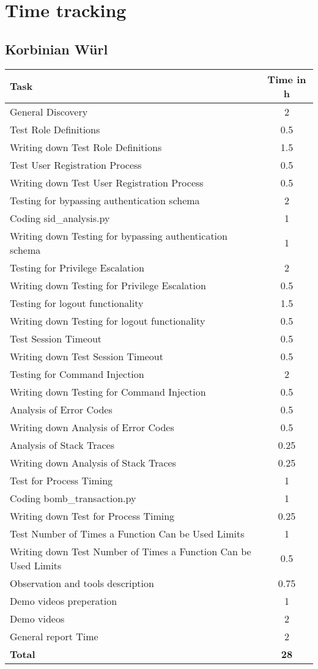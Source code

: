 \chapter{Time tracking}

\section{Korbinian Würl}
\begin{table}[H]
\tiny
\begin{tabular*}{\textwidth}{@{\extracolsep{\fill}} l c@{\extracolsep{0pt}} }
\textbf{Task} & \textbf{Time in h} \\ \hline
	General Discovery							& 2 \\
	Test Role Definitions						& 0.5\\
	Writing down Test Role Definitions			& 1.5\\
	Test User Registration Process				& 0.5\\
	Writing down Test User Registration Process	& 0.5\\
	Testing for bypassing authentication schema & 2\\
	Coding sid\_analysis.py 					& 1 \\
	Writing down Testing for bypassing authentication schema & 1 \\
	Testing for Privilege Escalation			& 2\\
	Writing down Testing for Privilege Escalation & 0.5\\
	Testing for logout functionality			& 1.5\\
	Writing down Testing for logout functionality & 0.5 \\
	Test Session Timeout						& 0.5 \\
	Writing down Test Session Timeout			& 0.5 \\
	Testing for Command Injection 				& 2 \\
	Writing down Testing for Command Injection 	& 0.5 \\
	Analysis of Error Codes	   					& 0.5\\
	Writing down Analysis of Error Codes	   	& 0.5 \\
	Analysis of Stack Traces 					& 0.25\\
	Writing down Analysis of Stack Traces 		& 0.25 \\
	Test for Process Timing 					& 1 \\
	Coding bomb\_transaction.py 				& 1 \\
	Writing down Test for Process Timing 		& 0.25 \\
	Test Number of Times a Function Can be Used Limits & 1 \\
	Writing down Test Number of Times a Function Can be Used Limits & 0.5 \\
	Observation and tools description			& 0.75 \\
	Demo videos	preperation						& 1 \\
	Demo videos									& 2 \\
	General report Time							& 2 \\
\hline\hline
\textbf{Total}									& \textbf{28}
\end{tabular*}
\end{table}
\clearpage

